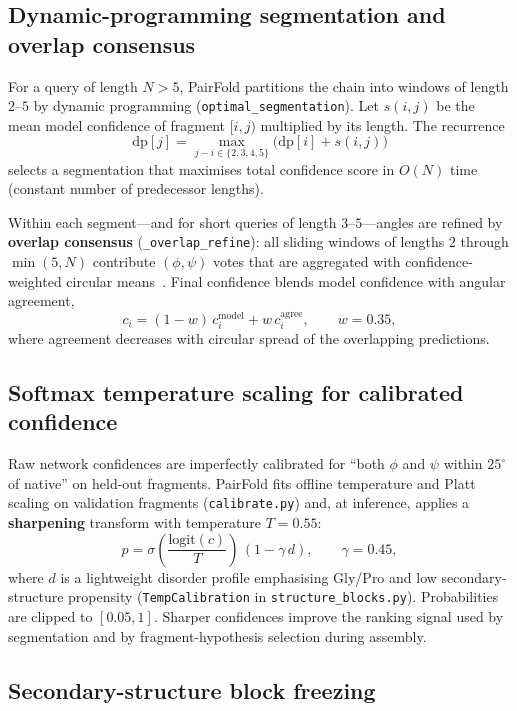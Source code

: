 \documentclass[11pt,a4paper]{article}
\begin{document}
\subsection{Dynamic-programming segmentation and overlap consensus}
\label{sec:segment}

For a query of length $N>5$, PairFold partitions the chain into windows of length $2$--$5$ by dynamic programming (\texttt{optimal\_segmentation}).
Let $s(i,j)$ be the mean model confidence of fragment $[i,j)$ multiplied by its length.
The recurrence
\[
  \mathrm{dp}[j] = \max_{j-i\in\{2,3,4,5\}} \bigl(\mathrm{dp}[i] + s(i,j)\bigr)
\]
selects a segmentation that maximises total confidence score in $O(N)$ time (constant number of predecessor lengths).

Within each segment---and for short queries of length $3$--$5$---angles are refined by \textbf{overlap consensus} (\texttt{\_overlap\_refine}):
all sliding windows of lengths $2$ through $\min(5,N)$ contribute $(\phi,\psi)$ votes that are aggregated with confidence-weighted circular means~\citep{berens2009circ}.
Final confidence blends model confidence with angular agreement,
\[
  c_i = (1-w)\,c^{\mathrm{model}}_i + w\,c^{\mathrm{agree}}_i,\qquad w{=}0.35,
\]
where agreement decreases with circular spread of the overlapping predictions.

\subsection{Softmax temperature scaling for calibrated confidence}
\label{sec:calib}

Raw network confidences are imperfectly calibrated for ``both $\phi$ and $\psi$ within $25^\circ$ of native'' on held-out fragments.
PairFold fits offline temperature and Platt scaling on validation fragments (\texttt{calibrate.py}) and, at inference, applies a \textbf{sharpening} transform with temperature $T{=}0.55$:
\[
  p = \sigma\!\left(\frac{\mathrm{logit}(c)}{T}\right)\,(1-\gamma\,d),\qquad \gamma{=}0.45,
\]
where $d$ is a lightweight disorder profile emphasising Gly/Pro and low secondary-structure propensity (\texttt{TempCalibration} in \texttt{structure\_blocks.py}).
Probabilities are clipped to $[0.05,1]$.
Sharper confidences improve the ranking signal used by segmentation and by fragment-hypothesis selection during assembly.

\subsection{Secondary-structure block freezing}
\label{sec:ss}
\end{document}
